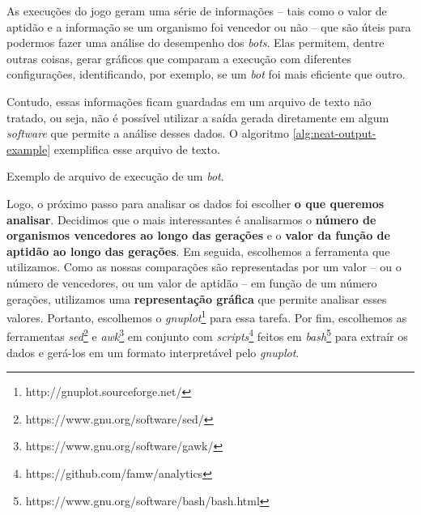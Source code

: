 As execuções do jogo geram uma série de informações -- tais como o valor de
aptidão e a informação se um organismo foi vencedor ou não -- que são úteis
para podermos fazer uma análise do desempenho dos \textit{bots}. Elas permitem,
dentre outras coisas, gerar gráficos que comparam a execução com diferentes
configurações, identificando, por exemplo, se um \textit{bot} foi mais
eficiente que outro.

Contudo, essas informações ficam guardadas em um arquivo de texto não tratado,
ou seja, não é possível utilizar a saída gerada diretamente em algum
\textit{software} que permite a análise desses dados. O algoritmo
\ref{alg:neat-output-example} exemplifica esse arquivo de texto.

\begin{algorithm}[H]

\caption[Exemplo de arquivo de execução de um \textit{bot}.]
{\label{alg:neat-output-example}Exemplo de arquivo de execução de um
    \textit{bot}.}
\end{algorithm}

Logo, o próximo passo para analisar os dados foi escolher \textbf{o que
queremos analisar}. Decidimos que o mais interessantes é analisarmos o
\textbf{número de organismos vencedores ao longo das gerações} e o
\textbf{valor da função de aptidão ao longo das gerações}. Em seguida,
escolhemos a ferramenta que utilizamos. Como as nossas comparações são
representadas por um valor -- ou o número de vencedores, ou um valor de aptidão
-- em função de um número gerações, utilizamos uma \textbf{representação
gráfica} que permite analisar esses valores. Portanto, escolhemos o
\textit{gnuplot}\footnote{http://gnuplot.sourceforge.net/} para essa tarefa.
Por fim, escolhemos as ferramentas
\textit{sed}\footnote{https://www.gnu.org/software/sed/} e
\textit{awk}\footnote{https://www.gnu.org/software/gawk/} em conjunto com
\textit{scripts}\footnote{https://github.com/famw/analytics} feitos em
\textit{bash}\footnote{https://www.gnu.org/software/bash/bash.html} para
extraír os dados e gerá-los em um formato interpretável pelo \textit{gnuplot}.
